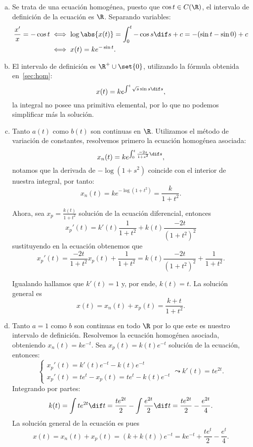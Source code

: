 \documentclass[../main.tex]{subfiles}
\begin{document}
\begin{solution}
	\begin{enumerate}[a), wide, labelwidth=0pt, labelindent=0pt]
		\item Se trata de una ecuación homogénea, puesto que
			\(\cos t \in C(\R)\), el intervalo de definición de la ecuación es
			\(\R\). Separando variables:
			\begin{align*}
				\frac{x'}{x} = -\cos t &\iff
				\log\abs{x(t)} = \int_0^t -\cos s \dif s + c
				= -(\sin t - \sin 0) + c \\
				&\iff x(t) = k e^{-\sin t}.
			\end{align*}

		\item El intervalo de definición es \(\R^+ \cup \set{0}\), utilizando la
			fórmula obtenida en~\ref{sec:hom}:
			\[x(t) = k e^{\int^t \sqrt{s} \sin s \dif s},\]
			la integral no posee una primitiva elemental, por lo que no podemos
			simplificar más la solución.

		\item Tanto \(a(t)\) como \(b(t)\) son continuas en \(\R\). Utilizamos
			el método de variación de constantes, resolvemos primero la ecuación
			homogénea asociada:
			\[x_n(t) = k e^{\int_0^t \frac{-2s}{1 + s^2} \dif s},\]
			notamos que la derivada de \(-\log(1 + s^2)\) coincide con el
			interior de nuestra integral, por tanto:
			\[x_n(t) = k e^{-\log(1 + t^2)} = \frac{k}{1 + t^2}.\]

			Ahora, sea \(x_p = \frac{k(t)}{1 + t^2}\) solución de la ecuación
			diferencial, entonces
			\[x_p'(t) = k'(t)\frac{1}{1 + t^2} + k(t)\frac{-2t}{(1 + t^2)^2}\]
			sustituyendo en la ecuación obtenemos que
			\[x_p'(t) = \frac{-2t}{1 + t^2} x_p(t) + \frac{1}{1 + t^2}
				= k(t)\frac{-2t}{(1 + t^2)^2}  + \frac{1}{1 + t^2}.\]

			Igualando hallamos que \(k'(t) = 1\) y, por ende, \(k(t) = t\).
			La solución general es
			\[x(t) = x_n(t) + x_p(t) = \frac{k + t}{1 + t^2}.\]

		\item Tanto \(a = 1\) como \(b\) son continuas en todo \(\R\) por lo que
			este es nuestro intervalo de definición. Resolvemos la ecuación
			homogénea asociada, obteniendo \(x_n(t) = k e^{-t}\). Sea
			\(x_p(t) = k(t) e^{-t}\) solución de la ecuación, entonces:
			\[\begin{cases}
				x_p'(t) = k'(t) e^{-t} - k(t) e^{-t} \\
				x_p'(t) = t e^t - x_p(t) = t e^t - k(t) e^{-t}
			  \end{cases}
			  \leadsto
			  k'(t) = t e^{2t}.
			\]
			Integrando por partes:
			\[k(t) = \int t e^{2t} \dif t
				= \frac{t e^{2t}}{2} - \int \frac{e^{2t}}{2} \dif t
				= \frac{t e^{2t}}{2} - \frac{e^{2t}}{4}.\]
			La solución general de la ecuación es pues
			\[x(t) = x_n(t) + x_p(t) = (k + k(t))e^{-t}
				= k e^{-t} + \frac{t e^{t}}{2} - \frac{e^{t}}{4}.\]
	\end{enumerate}
\end{solution}
\end{document}

